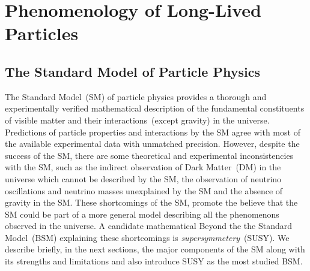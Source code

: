 
\chapter{Phenomenology of Long-Lived Particles}
\label{Long_Lived_Particle_physics_chapter}


\section{The Standard Model of Particle Physics}
The Standard Model~(SM) of particle physics provides a thorough and experimentally verified mathematical description of the fundamental constituents of visible matter and their interactions~(except gravity) in the universe. Predictions of particle properties and interactions by the SM agree with most of the available experimental data with unmatched precision.
However, despite the success of the SM, there are some theoretical and experimental inconsistencies with the SM, such as the indirect observation of Dark Matter~(DM) in the universe which cannot be described by the SM, the observation of neutrino oscillations and neutrino masses unexplained by the SM and the absence of gravity in the SM. These shortcomings of the SM, promote the believe that the SM could be part of a more general model describing all the phenomenons observed in the universe. A candidate mathematical Beyond the the Standard Model~(BSM) explaining these shortcomings is \textit{supersymmetery}~(SUSY).
\newline
We describe briefly, in the next sections, the major components of the SM along with its strengths and limitations and also introduce SUSY as the most studied BSM.
